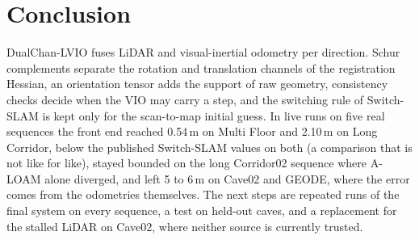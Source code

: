 \documentclass[journal]{IEEEtran}
\begin{document}
\section{Conclusion}
DualChan-LVIO fuses LiDAR and visual-inertial odometry per direction. Schur complements separate the rotation and translation channels of the registration Hessian, an orientation tensor adds the support of raw geometry, consistency checks decide when the VIO may carry a step, and the switching rule of Switch-SLAM is kept only for the scan-to-map initial guess. In live runs on five real sequences the front end reached 0.54\,m on Multi Floor and 2.10\,m on Long Corridor, below the published Switch-SLAM values on both (a comparison that is not like for like), stayed bounded on the long Corridor02 sequence where A-LOAM alone diverged, and left 5 to 6\,m on Cave02 and GEODE, where the error comes from the odometries themselves. The next steps are repeated runs of the final system on every sequence, a test on held-out caves, and a replacement for the stalled LiDAR on Cave02, where neither source is currently trusted.



\end{document}
